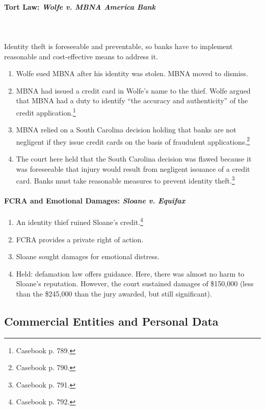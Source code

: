 \paragraph{Tort Law: \emph{Wolfe v. MBNA America Bank}}
~\\\\
Identity theft is foreseeable and preventable, so banks have to implement 
reasonable and cost-effective means to address it.

\begin{enumerate}
    \item Wolfe sued MBNA after his identity was stolen. MBNA moved to dismiss.
    \item MBNA had issued a credit card in Wolfe's name to the thief. Wolfe 
    argued that MBNA had a duty to identify ``the accuracy and authenticity'' of 
    the credit application.\footnote{Casebook p. 789.}
    \item MBNA relied on a South Carolina decision holding that banks are not 
    negligent if they issue credit cards on the basis of fraudulent 
    applications.\footnote{Casebook p. 790.}
    \item The court here held that the South Carolina decision was flawed 
    because it was foreseeable that injury would result from negligent issuance 
    of a credit card. Banks must take reasonable measures to prevent identity 
    theft.\footnote{Casebook p. 791.}
\end{enumerate}

\paragraph{FCRA and Emotional Damages: \emph{Sloane v. Equifax}}

\begin{enumerate}
    \item An identity thief ruined Sloane's credit.\footnote{Casebook p. 792.}
    \item FCRA provides a private right of action.
    \item Sloane sought damages for emotional distress.
    \item Held: defamation law offers guidance. Here, there was almost no harm 
    to Sloane's reputation. However, the court sustained damages of \$150,000 
    (less than the \$245,000 than the jury awarded, but still significant).
\end{enumerate}

\subsection{Commercial Entities and Personal Data}

